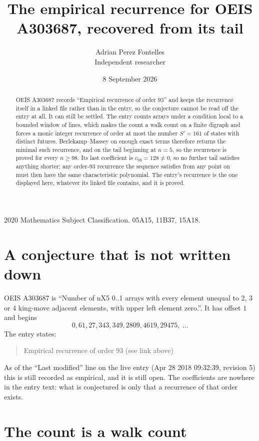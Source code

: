\documentclass[11pt,a4paper]{article}
\title{The empirical recurrence for OEIS A303687, recovered from its tail}
\author{Adrian Perez Fontelles\\ \small Independent researcher}
\date{8 September 2026}
\theoremstyle{plain}
\theoremstyle{definition}
\begin{document}
\maketitle

\begin{abstract}
OEIS A303687 records ``Empirical recurrence of order $93$'' and keeps the recurrence itself in
a linked file rather than in the entry, so the conjecture cannot be read off the entry at all.
It can still be settled. The entry counts arrays under a condition local to a bounded window of
lines, which makes the count a walk count on a finite digraph and forces a monic integer
recurrence of order at most the number $S'=161$ of states with distinct futures. Berlekamp--Massey on
enough exact terms therefore returns the minimal such recurrence, and on the tail beginning at $n=5$, so the recurrence is proved for every $n\ge98$.
Its last coefficient is $c_{93}=128\neq0$, so no further tail satisfies anything
shorter; any order-$93$ recurrence the sequence satisfies from any point on must then have
the same characteristic polynomial. The entry's recurrence is the one displayed here, whatever
its linked file contains, and it is proved.
\end{abstract}

\noindent\small 2020 Mathematics Subject Classification. 05A15, 11B37, 15A18.\normalsize

\section{A conjecture that is not written down}

OEIS A303687 is ``Number of nX5 0..1 arrays with every element unequal to 2, 3 or 4 king-move adjacent elements, with upper left element zero.''. It has offset $1$ and begins
\[
0, 61, 27, 343, 349, 2809, 4619, 29475,\ \dots
\]
The entry states:
\begin{quote}
Empirical recurrence of order 93 (see link above)
\end{quote}
As of the ``Last modified'' line on the live entry (Apr 28 2018 09:32:39, revision 5)
this is still recorded as empirical, and it is still open. The coefficients are nowhere in the
entry text: what is conjectured is only that a recurrence of that order exists.

\section{The count is a walk count}
\end{document}
